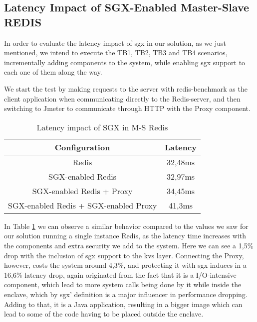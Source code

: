 \subsection{Latency Impact of SGX-Enabled Master-Slave REDIS}

In order to evaluate the latency impact of \gls{sgx} in our solution, as we just mentioned, we intend to execute the TB1, TB2, TB3 and TB4 scenarios, incrementally adding components to the system, while enabling \gls{sgx} support to each one of them along the way. 

We start the test by making requests to the server with redis-benchmark as the client application when communicating directly to the Redis-server, and then switching to Jmeter to communicate through HTTP with the Proxy component.

\begin{table}[ht]
	\caption{Latency impact of SGX in M-S Redis} %
	\centering %
	\begin{tabular}{c c} %
		\hline\hline %
		\textbf{Configuration} & \textbf{Latency} \\ [0.5ex] %
		\hline
		Redis & 32,48ms\\
		\hline
		SGX-enabled Redis & 32,97ms \\
		\hline
		SGX-enabled Redis + Proxy & 34,45ms \\
		\hline %
		SGX-enabled Redis + SGX-enabled Proxy & 41,3ms\\ [1ex] %
		\hline %
	\end{tabular}
	\label{table:latencyMasterSlaveRedis} %
\end{table}

In Table \ref{table:latencyMasterSlaveRedis} we can observe a similar behavior compared to the values we saw for our solution running a single instance Redis, as the latency time increases with the components and extra security we add to the system. Here we can see a 1,5\% drop with the inclusion of \gls{sgx} support to the \gls{kvs} layer. Connecting the Proxy, however, costs the system around 4,3\%, and protecting it with \gls{sgx} induces in a 16,6\% latency drop, again originated from the fact that it is a I/O-intensive component, which lead to more system calls being done by it while inside the enclave, which by \gls{sgx}' definition is a major influencer in performance dropping. Adding to that, it is a Java application, resulting in a bigger image which can lead to some of the code having to be placed outside the enclave.

